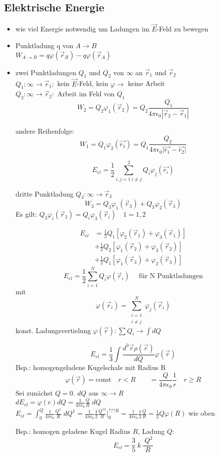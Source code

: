 \documentclass[titlepage,12pt,a4paper,ngerman]{report}
\newcommand{\tx}[1]{\textrm{#1}}
\begin{document}
\subsection{Elektrische Energie}
\begin{itemize}
\item wie viel Energie notwendig um Ladungen im $\vec{E}$-Feld zu bewegen
\item Punktladung q von $A \rightarrow B$\\
$ W_{A\rightarrow B}= q \varphi(\vec{r}_B) - q \varphi(\vec{r}_A)$
\item zwei Punktladungen $Q_1$ und $Q_2$ von $\infty$ an $\vec{r}_1$ und $\vec{r}_2$\\
$Q_1: \infty \rightarrow \vec{r}_1:$ kein $\vec{E}$-Feld, kein $\varphi \rightarrow$ keine Arbeit\\
$Q_2: \infty \rightarrow \vec{r}_2:$ Arbeit im Feld von $Q_1$\\
$$W_2 = Q_2 \varphi_1(\vec{r}_2) = Q_2 \frac{Q_1}{4\pi\epsilon_0 |\vec{r}_2 - \vec{r}_1|}$$ 

andere Reihenfolge: $$W_1 = Q_1 \varphi_2 (\vec{r_1}) = Q_1 \frac{Q_2}{4 \pi \epsilon_0  \vert \vec{r_1} - \vec{r_2}\vert }$$

$$E_{el} = \frac{1}{2} \sum_{i,j=1 \ i\neq j}^{2}Q_i \varphi_j(\vec{r_i})$$

dritte Punktladung $Q_3 : \infty \rightarrow \vec{r}_3$\\
$$W_3 = Q_3 \varphi_1(\vec{r}_3) + Q_3 \varphi_2(\vec{r}_3)$$
Es gilt: $Q_3 \varphi_i(\vec{r}_3) = Q_i \varphi_3(\vec{r}_i) \quad 1 = 1,2$

\begin{align*}
E_{el} &= \frac{1}{2} Q_1 [\varphi_2(\vec{r}_1) + \varphi_3(\vec{r}_1)] \\
& + \frac{1}{2} Q_2 [\varphi_1(\vec{r}_2) + \varphi_3(\vec{r}_2)] \\
& + \frac{1}{2} Q_1 [\varphi_1(\vec{r}_3) + \varphi_2(\vec{r}_3)]
\end{align*}
$$E_{el} = \frac{1}{2} \sum_{i=1}^N Q_i \varphi(\vec{r}_i) \quad \tx{ für N Punktladungen}$$
mit $$\varphi(\vec{r}_i) = \sum^N_{\substack{ i=1 \\ i \neq j }} \varphi_j(\vec{r}_i)$$
konst. Ladungsvertielung $\varphi(\vec{r}) : \sum Q_i \rightarrow \int dQ$

$$E_{el}= \frac{1}{3} \int \frac{d^3\vec{r} \rho (\vec{r})}{dQ} \varphi(\vec{r})$$
Bsp.: homogengeladene Kugelschale mit Radius R
$$\varphi(\vec{r}) = \tx{const} \quad  r<R \qquad = \frac{Q}{4\pi\epsilon_0} \frac{1}{r} \quad r\ge R$$
Sei zunächst $Q = 0$. $dQ$ aus $\infty \rightarrow R$\\
$dE_{el}= \varphi(e) dQ = \frac{1}{4\pi\epsilon_0} \frac{Q}{R} \; dQ$\\
$E_{el}= \int^Q_0 \frac{1}{4\pi\epsilon_0} \frac{Q^1}{R} \; dQ^1 = \frac{1}{4\pi\epsilon_0} \frac{1}{2} \frac{Q^{12}}{R} \bigg\vert_0^{???R} = \frac{1}{4\pi\epsilon_0} \frac{1}{2} \frac{Q}{R} = \frac{1}{2} Q \varphi(R)$ wie oben


Bsp.: homogen geladene Kugel Radius $R$, Ladung $Q$:
$$E_{el} = \frac{3}{5}\ k\ \frac{\ Q^2}{R}$$


\end{itemize}
\end{document}

